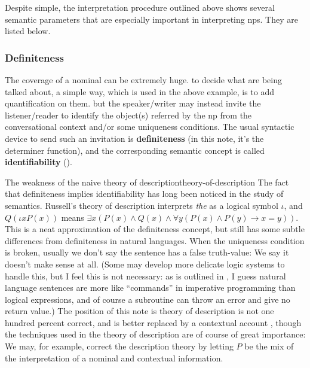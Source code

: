 \documentclass[UTF8, a4paper, oneside, scheme=plain]{ctexrep}
\newcommand*{\citepage}[1]{p.~{#1}}
\newcommand*{\concept}[1]{\textbf{#1}}
\newcommand{\corpus}[1]{\emph{#1}}
\begin{document}
Despite simple, the interpretation procedure outlined above 
shows several semantic parameters that are especially important 
in interpreting \acs{np}s.
They are listed below.

\subsubsection{Definiteness}

The coverage of a nominal can be extremely huge.
to decide what are being talked about,
a simple way, which is used in the above example, 
is to add quantification on them.
but the speaker/writer may instead invite the listener/reader to 
identify the object(s) referred by the \acs{np} 
from the conversational context
and/or some uniqueness conditions.
The usual syntactic device to send such an invitation 
is \concept{definiteness} 
(in this note, it's the determiner function),
and the corresponding semantic concept is called \concept{identifiability}
().

\begin{theorybox}{The weakness of the naive theory of description}{theory-of-description}
    The fact that definiteness implies identifiability has long been noticed in the study of semantics.
    Russell's theory of description interprets \corpus{the} 
    as a logical symbol $\iota$,
    and $Q(\iota x P(x))$
    means $\exists x (P(x) \land Q(x) \land \forall y (P(x) \land P(y) \rightarrow  x = y)) $.
    This is a neat approximation of the definiteness concept,
    but still has some subtle differences from definiteness in natural languages.
    When the uniqueness condition is broken, 
    usually we don't say the sentence has a false truth-value:
    We say it doesn't make sense at all.
    (Some may develop more delicate logic systems to handle this,
    but I feel this is not necessary:
    as is outlined in ,
    I guess natural language sentences are more like 
    ``commands'' in imperative programming than logical expressions,
    and of course a subroutine can throw an error and give no return value.)
    The position of this note is 
    theory of description is not one hundred percent correct,
    and is better replaced by a contextual account \citep[\citepage{368}]{cgel},
    though the techniques used in the theory of description
    are of course of great importance:
    We may, for example, correct the description theory 
    by letting $P$ be the mix of the interpretation of a nominal and contextual information.
\end{theorybox}
\end{document}
